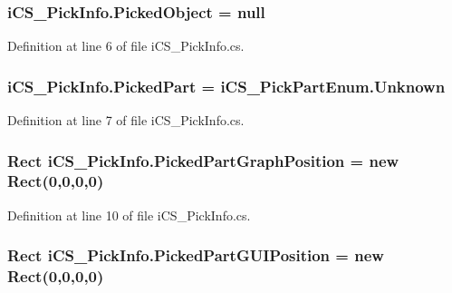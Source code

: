 \hypertarget{classi_c_s___pick_info_a704979f906c7c80875b53e41a07506cd}{
\subsubsection[{Picked\+Object}]{ i\+C\+S\+\_\+\+Pick\+Info.\+Picked\+Object = null}}\label{classi_c_s___pick_info_a704979f906c7c80875b53e41a07506cd}


Definition at line 6 of file i\+C\+S\+\_\+\+Pick\+Info.\+cs.

\hypertarget{classi_c_s___pick_info_a3d3c3fd5a4e46a04e05daf6cbd99aa34}{
\subsubsection[{Picked\+Part}]{ i\+C\+S\+\_\+\+Pick\+Info.\+Picked\+Part = {\bf i\+C\+S\+\_\+\+Pick\+Part\+Enum.\+Unknown}}}\label{classi_c_s___pick_info_a3d3c3fd5a4e46a04e05daf6cbd99aa34}


Definition at line 7 of file i\+C\+S\+\_\+\+Pick\+Info.\+cs.

\hypertarget{classi_c_s___pick_info_aa46d3175ae28400ff751f566125a839b}{
\subsubsection[{Picked\+Part\+Graph\+Position}]{\setlength{\rightskip}{0pt plus 5cm}Rect i\+C\+S\+\_\+\+Pick\+Info.\+Picked\+Part\+Graph\+Position = new Rect(0,0,0,0)}}\label{classi_c_s___pick_info_aa46d3175ae28400ff751f566125a839b}


Definition at line 10 of file i\+C\+S\+\_\+\+Pick\+Info.\+cs.

\hypertarget{classi_c_s___pick_info_a16f6b05ea00855c3b86080af99cb7124}{
\subsubsection[{Picked\+Part\+G\+U\+I\+Position}]{\setlength{\rightskip}{0pt plus 5cm}Rect i\+C\+S\+\_\+\+Pick\+Info.\+Picked\+Part\+G\+U\+I\+Position = new Rect(0,0,0,0)}}\label{classi_c_s___pick_info_a16f6b05ea00855c3b86080af99cb7124}



